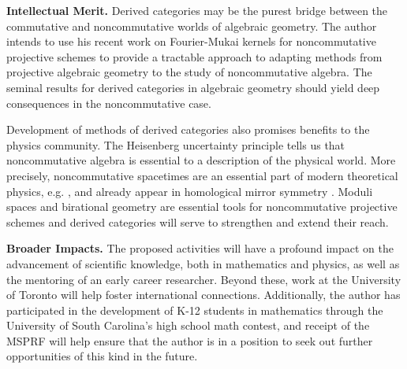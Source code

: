 \documentclass[11pt]{article}
\begin{document}



\noindent\textbf{Intellectual Merit.}
Derived categories may be the purest bridge between the commutative and noncommutative worlds of algebraic geometry.
The author intends to use his recent work on Fourier-Mukai kernels for noncommutative projective schemes to provide a tractable approach to adapting methods from projective algebraic geometry to the study of noncommutative algebra.
The seminal results for derived categories in algebraic geometry should yield deep consequences in the noncommutative case.

Development of methods of derived categories also promises benefits to the physics community.
The Heisenberg uncertainty principle tells us that noncommutative algebra is essential to a description of the physical world.
More precisely, noncommutative spacetimes are an essential part of modern theoretical physics, e.g. \cite{DoNe01}, and already appear in homological mirror symmetry \cite{AKO08}.
Moduli spaces and birational geometry are essential tools for noncommutative projective schemes and derived categories will serve to strengthen and extend their reach.

\noindent\textbf{Broader Impacts.}
The proposed activities will have a profound impact on the advancement of scientific knowledge, both in mathematics and physics, as well as the mentoring of an early career researcher.
Beyond these, work at the University of Toronto will help foster international connections.
Additionally, the author has participated in the development of K-12 students in mathematics through the University of South Carolina's high school math contest, and receipt of the MSPRF will help ensure that the author is in a position to seek out further opportunities of this kind in the future.

\end{document}
